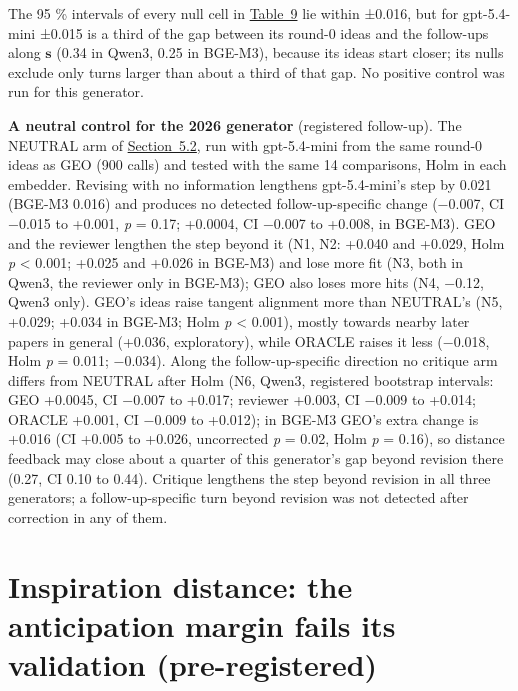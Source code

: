 \documentclass[
  10pt,
]{article}
\begin{document}
The 95 \% intervals of every null cell
in \hyperref[tab:9]{Table~9} lie within
±0.016, but for gpt-5.4-mini ±0.015 is a
third of the gap between its round-0
ideas and the follow-ups along
\(\mathbf{s}\) (0.34 in Qwen3, 0.25 in
BGE-M3), because its ideas start closer;
its nulls exclude only turns larger than
about a third of that gap. No positive
control was run for this generator.

\textbf{A neutral control for the 2026
generator} (registered follow-up). The
NEUTRAL arm of
\hyperref[sec:5.2]{Section~5.2}, run
with gpt-5.4-mini from the same round-0
ideas as GEO (900 calls) and tested with
the same 14 comparisons, Holm in each
embedder. Revising with no information
lengthens gpt-5.4-mini's step by 0.021
(BGE-M3 0.016) and produces no detected
follow-up-specific change (−0.007, CI
−0.015 to +0.001, \emph{p} = 0.17;
+0.0004, CI −0.007 to +0.008, in
BGE-M3). GEO and the reviewer lengthen
the step beyond it (N1, N2: +0.040 and
+0.029, Holm \emph{p} \textless{} 0.001;
+0.025 and +0.026 in BGE-M3) and lose
more fit (N3, both in Qwen3, the
reviewer only in BGE-M3); GEO also loses
more hits (N4, −0.12, Qwen3 only). GEO's
ideas raise tangent alignment more than
NEUTRAL's (N5, +0.029; +0.034 in BGE-M3;
Holm \emph{p} \textless{} 0.001), mostly
towards nearby later papers in general
(+0.036, exploratory), while ORACLE
raises it less (−0.018, Holm \emph{p} =
0.011; −0.034). Along the
follow-up-specific direction no critique
arm differs from NEUTRAL after Holm (N6,
Qwen3, registered bootstrap intervals:
GEO +0.0045, CI −0.007 to +0.017;
reviewer +0.003, CI −0.009 to +0.014;
ORACLE +0.001, CI −0.009 to +0.012); in
BGE-M3 GEO's extra change is +0.016 (CI
+0.005 to +0.026, uncorrected \emph{p} =
0.02, Holm \emph{p} = 0.16), so distance
feedback may close about a quarter of
this generator's gap beyond revision
there (0.27, CI 0.10 to 0.44). Critique
lengthens the step beyond revision in
all three generators; a
follow-up-specific turn beyond revision
was not detected after correction in any
of them.

\section{Inspiration distance: the anticipation margin fails its validation (pre-registered)}\label{sec:6}
\end{document}
